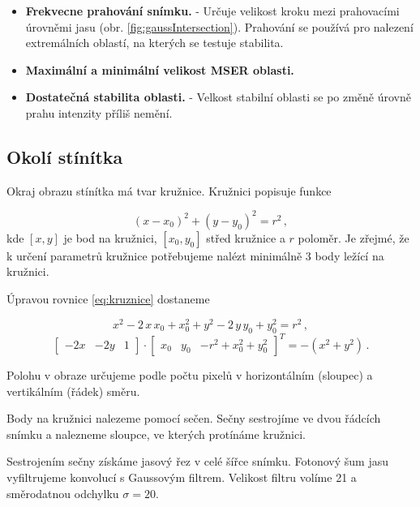    \begin{itemize}
   \item \textbf{Frekvecne prahování snímku.} - Určuje velikost kroku mezi prahovacími úrovněmi jasu (obr. \ref{fig:gaussIntersection}). Prahování se používá pro nalezení extremálních oblastí, na kterých se testuje stabilita.
   
   \item \textbf{Maximální a minimální velikost MSER oblasti.} 
   
   \item \textbf{Dostatečná stabilita oblasti.} - Velkost stabilní oblasti se po změně úrovně prahu intenzity příliš nemění. 
   \end{itemize}
   
\subsection{Okolí stínítka}
\label{sec:okoliStinitka}
	Okraj obrazu stínítka má tvar kružnice. Kružnici popisuje funkce
	
	\begin{equation}
	\left(x-x_0\right)^2 + \left(y-y_0\right)^2 = r^2\,,
	\label{eq:kruznice}
	\end{equation}
	kde $\left[x,y\right]$ je bod na kružnici, $\left[x_0,y_0\right]$ střed kružnice a $r$ poloměr. Je zřejmé, že k určení parametrů kružnice potřebujeme nalézt minimálně 3 body ležící na kružnici. 

	Úpravou rovnice \ref{eq:kruznice} dostaneme

	\begin{equation}
	x^2 -2\,x\,x_0 + x_0^2 + y^2 -2\,y\,y_0 + y_0^2 = r^2\,,
	\end{equation}
	\begin{equation}
	\begin{bmatrix}
    -2x &-2y &1 
	\end{bmatrix} \cdot 
	\begin{bmatrix}
    x_0 & y_0 & -r^2+x_0^2+y_0^2
	\end{bmatrix}^T = -\left(x^2+y^2\right)\,.
	\end{equation}


Polohu v obraze určujeme podle počtu pixelů v horizontálním (sloupec) a vertikálním (řádek) směru.
  
Body na kružnici nalezeme pomocí sečen. Sečny sestrojíme ve dvou řádcích snímku a nalezneme sloupce, ve kterých protínáme kružnici.  

Sestrojením sečny získáme jasový řez v celé šířce snímku. Fotonový šum jasu vyfiltrujeme konvolucí s Gaussovým filtrem. Velikost filtru volíme \SI{21}{\px} a směrodatnou odchylku $\sigma = 20$. 

